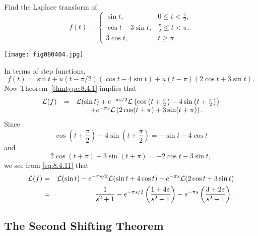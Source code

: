 \documentclass{ximera}
\begin{document}
\begin{example}\label{example:8.4.5}
 Find the Laplace transform of
\begin{equation} \label{eq:8.4.10}
f(t)=\left\{\begin{array}{cl}
\sin t,&0\leq t<\frac{\pi}{2},\\
\cos t-3\sin t,&\frac{\pi}{2}\leq t<\pi,\\
 3\cos t,&t\geq\pi
\end{array}\right.
\end{equation}
\begin{image}
 \texttt{[image: fig080404.jpg]}
 \end{image}
\begin{explanation}
In terms of step functions,
$$
f(t)=\sin t+u(t-\pi/2) (\cos t-4\sin t)+u(t-\pi) (2
\cos t+3\sin t).
$$
Now Theorem~\ref{thmtype:8.4.1} implies that
\begin{equation}\label{eq:8.4.11}
\begin{array}{ccl}
{\cal L}(f)&=&{\cal L}(\sin t)+e^{-\pi s/2}{\cal L}
\left(\cos\left(t+\frac{\pi}{2}\right)-4\sin\left(t+\frac{\pi}{2}\right)\right)\\
&&\qquad+e^{-\pi s}{\cal L}\left(2\cos(t+\pi)+3\sin(t+\pi)\right).
\end{array}
\end{equation}
Since
$$
\cos\left(t+\frac{\pi}{2}\right)-4\sin\left(t+\frac{\pi}{2}\right)=-\sin t-4\cos t
$$
and
$$
 2\cos (t+\pi)+3\sin (t+\pi)=-2\cos t-3\sin t,
$$
we see from \eqref{eq:8.4.11} that
\begin{eqnarray*}
{\cal L}(f)&=&{\cal L}(\sin t)-e^{-\pi s/2}{\cal L}(\sin t+4\cos t)
-e^{-\pi s}{\cal L}(2\cos t+3\sin t)\\
&=&\frac{1}{s^2+1}-e^{-\pi s/2} \left(\frac{1+4s}{s^2+1}\right)
-e^{-\pi s}\left(\frac{3+2s}{s^2+1}\right).
\end{eqnarray*}
\end{explanation}
\end{example}




\subsection*{The Second Shifting Theorem}
\end{document}
